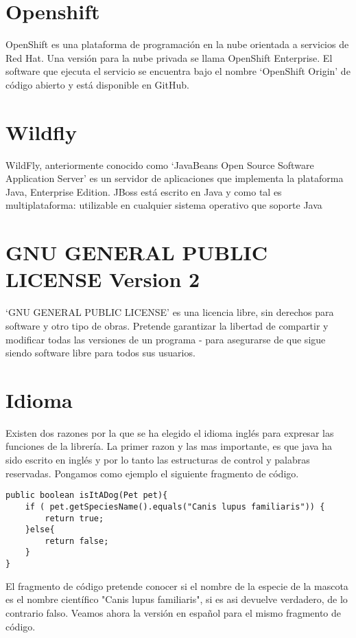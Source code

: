 	\section{Openshift}
		OpenShift es una plataforma de programación en la nube orientada a servicios de Red Hat. Una versión para la nube privada se llama OpenShift Enterprise. El software que ejecuta el servicio se encuentra bajo el nombre `OpenShift Origin' de código abierto y está disponible en GitHub.

	\section{Wildfly}
		WildFly, anteriormente conocido como `JavaBeans Open Source Software Application Server' es un servidor de aplicaciones que implementa la plataforma Java, Enterprise Edition. JBoss está escrito en Java y como tal es multiplataforma: utilizable en cualquier sistema operativo que soporte Java

	\section{GNU GENERAL PUBLIC LICENSE Version 2}

		`GNU GENERAL PUBLIC LICENSE' es una licencia libre, sin derechos para software y otro tipo de obras. Pretende garantizar la libertad de compartir y modificar todas las versiones de un programa - para asegurarse de que sigue siendo software libre para todos sus usuarios.
		
	\section{Idioma}

		Existen dos razones por la que se ha elegido el idioma inglés para expresar las funciones de la librería. La primer razon y las mas importante, es que java ha sido escrito en inglés y por lo tanto las estructuras de control y palabras reservadas. Pongamos como ejemplo el siguiente fragmento de código.

\begin{lstlisting}
public boolean isItADog(Pet pet){
	if ( pet.getSpeciesName().equals("Canis lupus familiaris")) {
		return true;
	}else{
		return false;
	}
}
\end{lstlisting}

	El fragmento de código pretende conocer si el nombre de la especie de la mascota es el nombre científico "Canis lupus familiaris", si es asi devuelve verdadero, de lo contrario falso. Veamos ahora la versión en español para el mismo fragmento de código.

